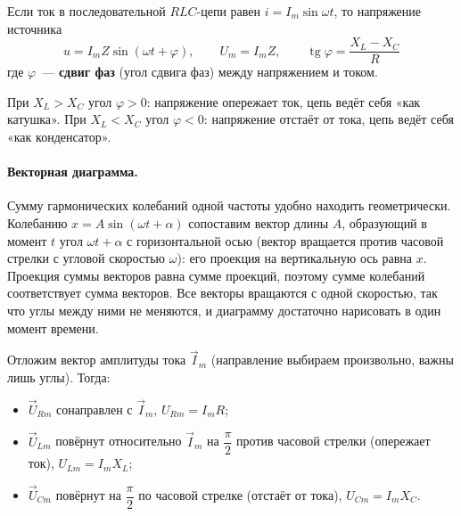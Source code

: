 \documentclass[12pt]{article}
\begin{document}
	\begin{statement}
		Если ток в последовательной $RLC$-цепи равен $i = I_m \sin \omega t$, то напряжение источника
		\[
			\boxed{u = I_m Z \sin (\omega t + \varphi), \qquad U_m = I_m Z, \qquad \operatorname{tg} \varphi = \dfrac{X_L - X_C}{R}}
		\]
		где $\varphi$~--- \textbf{сдвиг фаз} (угол сдвига фаз) между напряжением и током.
	\end{statement}
	
	\begin{note}
		При $X_L > X_C$ угол $\varphi > 0$: напряжение опережает ток, цепь ведёт себя «как катушка». При $X_L < X_C$ угол $\varphi < 0$: напряжение отстаёт от тока, цепь ведёт себя «как конденсатор».
	\end{note}

	\paragraph{Векторная диаграмма.}
	Сумму гармонических колебаний одной частоты удобно находить геометрически. Колебанию $x = A \sin (\omega t + \alpha)$ сопоставим вектор длины $A$, образующий в момент $t$ угол $\omega t + \alpha$ с горизонтальной осью (вектор вращается против часовой стрелки с угловой скоростью $\omega$): его проекция на вертикальную ось равна $x$. Проекция суммы векторов равна сумме проекций, поэтому сумме колебаний соответствует сумма векторов. Все векторы вращаются с одной скоростью, так что углы между ними не меняются, и диаграмму достаточно нарисовать в один момент времени.
	
	Отложим вектор амплитуды тока $\vec I_m$ (направление выбираем произвольно, важны лишь углы). Тогда:
	\begin{itemize}
		\item $\vec U_{Rm}$ сонаправлен с $\vec I_m$, $U_{Rm} = I_m R$;
		\item $\vec U_{Lm}$ повёрнут относительно $\vec I_m$ на $\dfrac{\pi}{2}$ против часовой стрелки (опережает ток), $U_{Lm} = I_m X_L$;
		\item $\vec U_{Cm}$ повёрнут на $\dfrac{\pi}{2}$ по часовой стрелке (отстаёт от тока), $U_{Cm} = I_m X_C$.
	\end{itemize}
	
\end{document}
